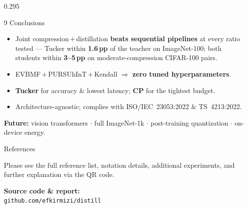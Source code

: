 \documentclass[final]{beamer}
\begin{document}
\begin{frame}[t]{}
\begin{columns}[t,onlytextwidth]
\begin{column}{0.295\textwidth}
\vspace{5mm}

\begin{pblock}{9 \;\; Conclusions}
\begin{itemize}
  \item Joint compression\,+\,distillation \textbf{beats sequential pipelines}
        at every ratio tested --- Tucker within \textbf{1.6\,pp} of the teacher
        on ImageNet-100; both students within \textbf{3--5\,pp} on
        moderate-compression CIFAR-100 pairs.
  \item EVBMF\,+\,PURSUhInT\,+\,Kendall $\Rightarrow$ \textbf{zero tuned
        hyperparameters}.
  \item \textbf{Tucker} for accuracy \& lowest latency; \textbf{CP} for the
        tightest budget.
  \item Architecture-agnostic; complies with \mbox{ISO/IEC 23053:2022} \&
        \mbox{TS 4213:2022}.
\end{itemize}
{\small\color{itudark}\textbf{Future:} vision transformers $\cdot$ full
ImageNet-1k $\cdot$ post-training quantization $\cdot$ on-device energy.}
\end{pblock}

\vspace{5mm}

\begin{pblock}{References}
\begin{minipage}[c]{0.56\linewidth}
  {\small\setlength{\parskip}{1.5mm}
  Please see the full reference list, notation details, additional experiments,
  and further explanation via the QR code.\par
  \vspace{3mm}
  \textbf{\color{itudark}Source code \& report:}\\
  \texttt{\small github.com/efkirmizi/distill}}
\end{minipage}\hfill
\begin{minipage}[c]{0.38\linewidth}
  \centering
\end{minipage}
\end{pblock}

\end{column}
\end{columns}

\vfill

\end{frame}
\end{document}
